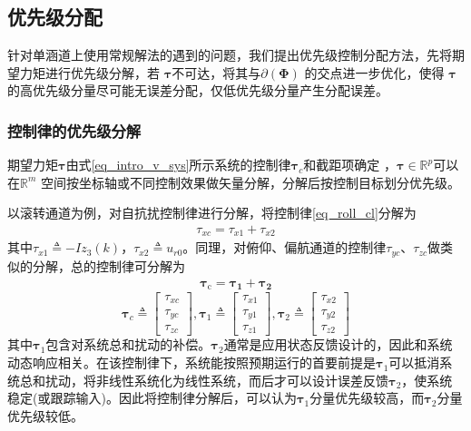\subsection{优先级分配}
%
针对单涵道上使用常规解法的遇到的问题，我们提出优先级控制分配方法，先将期望力矩进行优先级分解，若 $ \bm{\tau} $不可达，将其与$\partial(\bm{\Phi})$ 的交点进一步优化，使得 $ \bm{\tau} $ 的高优先级分量尽可能无误差分配，仅低优先级分量产生分配误差。
%
\subsubsection{控制律的优先级分解}
%
期望力矩$ \bm{\tau} $由式\eqref{eq_intro_v_sys}所示系统的控制律$ \bm{\tau}_c $和截距项确定 ，$ \bm{\tau} \in {\mathbb{R}}^p$可以在$ {\mathbb{R}}^m $ 空间按坐标轴或不同控制效果做矢量分解，分解后按控制目标划分优先级。

以滚转通道为例，对自抗扰控制律进行分解，将控制律\eqref{eq_roll_cl}分解为
\begin{align}
\tau_{xc}=\tau _{x1}+\tau_{x2}
\end{align}
其中$ \tau_{x 1}  \triangleq-I z_{3}(k) $，$ \tau_{x 2}  \triangleq u_{r0}  $。同理，对俯仰、偏航通道的控制律$\tau_{yc}$、$\tau_{zc}$做类似的分解，总的控制律可分解为
\begin{align}
\bm{\tau_{\mathrm{c}}}=\bm{\tau_{1}}+\bm{\tau_{2}}	\label{control_law}
\end{align}
\begin{equation}
\bm{\tau}_c \triangleq  \begin{bmatrix}
\tau_{x c} \\
\tau_{y c} \\
\tau_{z c}
\end{bmatrix}, 
\bm{\tau}_{1} \triangleq  \begin{bmatrix}
\tau_{x 1} \\
\tau_{y 1} \\
\tau_{z 1}
\end{bmatrix},
\bm{\tau}_{2} \triangleq  \begin{bmatrix}
\tau_{x 2} \\
\tau_{y 2} \\
\tau_{z 2}
\end{bmatrix}
\end{equation}
其中$\bm{\tau}_1$包含对系统总和扰动的补偿。$\bm{\tau}_2$通常是应用状态反馈设计的，因此和系统动态响应相关。在该控制律下，系统能按照预期运行的首要前提是$\bm{\tau}_1$可以抵消系统总和扰动，将非线性系统化为线性系统，而后才可以设计误差反馈$\bm{\tau}_2$，使系统稳定(或跟踪输入)。因此将控制律分解后，可以认为$\bm{\tau}_1$分量优先级较高，而$\bm{\tau}_2$分量优先级较低。


